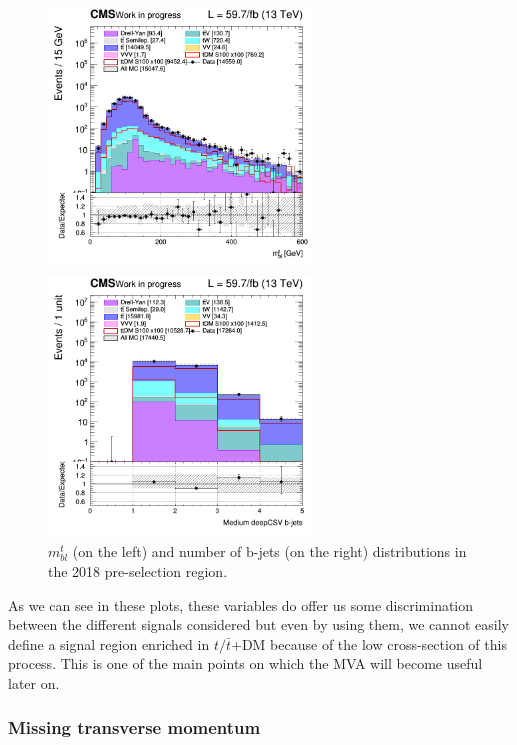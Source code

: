 \documentclass[a4paper, 10pt, openright]{report}
\begin{document}
\begin{figure}[htbp]
\centering
\begin{minipage}[b]{.48\textwidth}
\includegraphics[width=7cm, height=7cm]{figs/2018/SmearSR-ttDM-scalar100/log_cratio_topCR_ll_mblt.png}
\end{minipage}\hfill
\begin{minipage}[b]{.48\textwidth}
\includegraphics[width=7cm, height=7cm]{figs/2018/SmearSR-ttDM-scalar100/log_cratio_topCR_ll_nbjet.png}
\end{minipage} \hfill
\caption{$m_{bl}^t$ (on the left) and number of b-jets (on the right) distributions in the 2018 pre-selection region.}
\label{fig:SRdiscmblt}
\end{figure}

As we can see in these plots, these variables do offer us some discrimination between the different signals considered but even by using them, we cannot easily define a signal region enriched in $t/ \bar t$+DM because of the low cross-section of this process. This is one of the main points on which the \ac{MVA} will become useful later on.

\subsubsection*{Missing transverse momentum}
\end{document}
